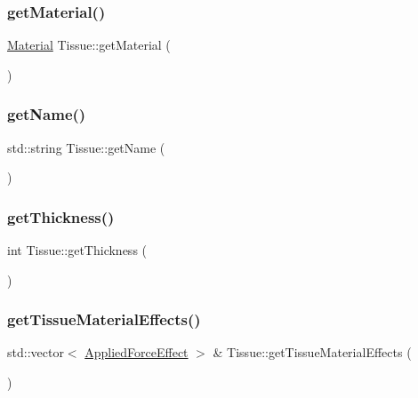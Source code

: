 \mbox{\label{class_tissue_a07bb83918c0e9bc36ade236971f0436e}} 
\subsubsection{\texorpdfstring{get\+Material()}{getMaterial()}}
{\footnotesize\ttfamily \mbox{\hyperlink{class_material}{Material}} Tissue\+::get\+Material (\begin{DoxyParamCaption}{ }\end{DoxyParamCaption})}

\mbox{\label{class_tissue_a0c0972433998857befee73dbf1fedf31}} 
\subsubsection{\texorpdfstring{get\+Name()}{getName()}}
{\footnotesize\ttfamily std\+::string Tissue\+::get\+Name (\begin{DoxyParamCaption}{ }\end{DoxyParamCaption})}

\mbox{\label{class_tissue_a200a50df2fcb4474987575f22403a4c3}} 
\subsubsection{\texorpdfstring{get\+Thickness()}{getThickness()}}
{\footnotesize\ttfamily int Tissue\+::get\+Thickness (\begin{DoxyParamCaption}{ }\end{DoxyParamCaption})}

\mbox{\label{class_tissue_a28cafce7378e40c702e63f342e6b37b2}} 
\subsubsection{\texorpdfstring{get\+Tissue\+Material\+Effects()}{getTissueMaterialEffects()}}
{\footnotesize\ttfamily std\+::vector$<$ \mbox{\hyperlink{struct_applied_force_effect}{Applied\+Force\+Effect}} $>$ \& Tissue\+::get\+Tissue\+Material\+Effects (\begin{DoxyParamCaption}{ }\end{DoxyParamCaption})}

